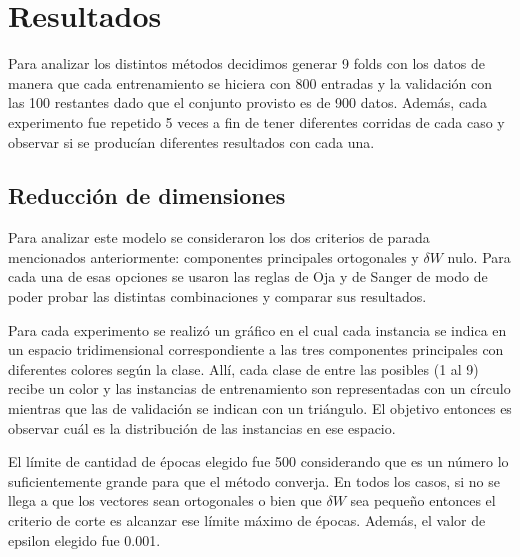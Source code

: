 \documentclass[informe.tex]{subfiles}
\begin{document}
  
  \section{Resultados}
    Para analizar los distintos métodos decidimos generar 9 folds con los datos de manera que cada entrenamiento se hiciera con 800 entradas y la validación con las 100 restantes dado que el conjunto provisto es de 900 datos. Además, cada experimento fue repetido 5 veces a fin de tener diferentes corridas de cada caso y observar si se produc\'ian diferentes resultados con cada una.
    
    \subsection{Reducción de dimensiones}
      Para analizar este modelo se consideraron los dos criterios de parada mencionados anteriormente: componentes principales ortogonales y $\delta W$ nulo. Para cada una de esas opciones se usaron las reglas de Oja y de Sanger de modo de poder probar las distintas combinaciones y comparar sus resultados. 
      
      Para cada experimento se realizó un gráfico en el cual cada instancia se indica en un espacio tridimensional correspondiente a las tres componentes principales con diferentes colores según la clase. Allí, cada clase de entre las posibles (1 al 9) recibe un color y las instancias de entrenamiento son representadas con un círculo mientras que las de validación se indican con un triángulo. El objetivo entonces es observar cuál es la distribución de las instancias en ese espacio.
      
      El l\'imite de cantidad de \'epocas elegido fue 500 considerando que es un n\'umero lo suficientemente grande para que el método converja. En todos los casos, si no se llega a que los vectores sean ortogonales o bien que $\delta W$ sea pequeño entonces el criterio de corte es alcanzar ese límite máximo de épocas. Además, el valor de epsilon elegido fue 0.001.
      
\end{document}
